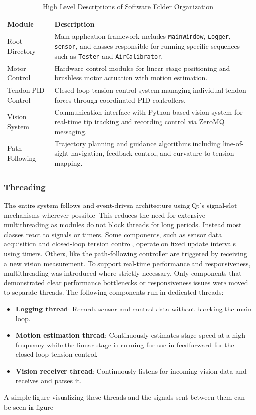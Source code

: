 \begin{table}[htbp]
\centering
\caption{High Level Descriptions of Software Folder Organization}
\begin{tabular}{p{}p{}}
\toprule
\textbf{Module} & \textbf{Description} \\
\midrule
Root Directory & Main application framework includes \texttt{MainWindow}, \texttt{Logger}, \texttt{sensor}, and classes responsible for running specific sequences such as \texttt{Tester} and \texttt{AirCalibrator}. \\
\addlinespace
Motor Control & Hardware control modules for linear stage positioning and brushless motor actuation with motion estimation. \\
\addlinespace
Tendon PID Control & Closed-loop tension control system managing individual tendon forces through coordinated PID controllers. \\
\addlinespace
Vision System & Communication interface with Python-based vision system for real-time tip tracking and recording control via ZeroMQ messaging. \\
\addlinespace
Path Following & Trajectory planning and guidance algorithms including line-of-sight navigation, feedback control, and curvature-to-tension mapping. \\
\bottomrule
\end{tabular}
\end{table}

\subsubsection{Threading}
The entire system follows and event-driven architecture using Qt's signal-slot mechanisms wherever possible. This reduces the need for extensive multithreading as modules do not block threads for long periods. Instead most classes react to signals or timers. Some components, such as sensor data acquisition and closed-loop tension control, operate on fixed update intervals using timers. Others, like the path-following controller are triggered by receiving a new vision measurement.
\newline \newline
To support real-time performance and responsiveness, multithreading was introduced where strictly necessary. Only components that demonstrated clear performance bottlenecks or responsiveness issues were moved to separate threads. The following components run in dedicated threads:
\begin{itemize}
    \item \textbf{Logging thread}: Records sensor and control data without blocking the main loop.
    \item \textbf{Motion estimation thread}: Continuously estimates stage speed at a high frequency while the linear stage is running for use in feedforward for the closed loop tension control.
    \item \textbf{Vision receiver thread}: Continuously listens for incoming vision data and receives and parses it.
\end{itemize}
A simple figure visualizing these threads and the signals sent between them can be seen in figure


